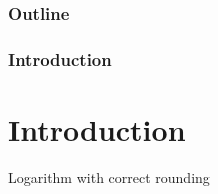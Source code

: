 \begin{frame}
\frametitle{Outline} 
\tableofcontents 
\end{frame}

\begin{frame}
    \frametitle{Introduction}
    \section{Introduction}
    \centering
    Logarithm with correct rounding
\end{frame}
